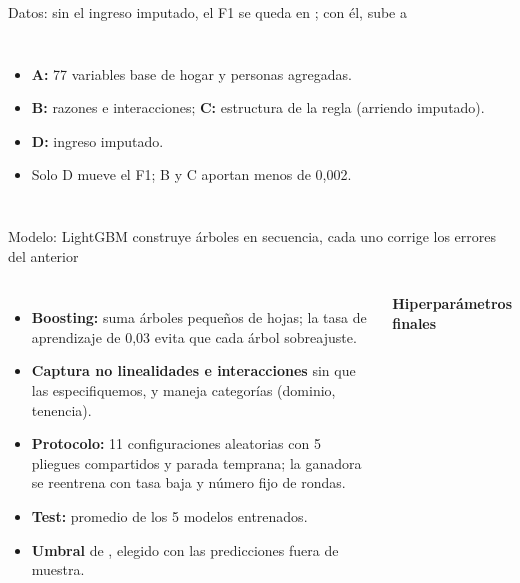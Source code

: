 \begin{frame}{Datos: sin el ingreso imputado, el F1 se queda en \nFoneA{}; con él, sube a \nFoneAD{}}
  \begin{columns}[T]
    \small
    \begin{itemize}\setlength{\itemsep}{3pt}
      \item \textbf{A:} 77 variables base de hogar y personas agregadas.
      \item \textbf{B:} razones e interacciones; \textbf{C:} estructura de la regla (arriendo imputado).
      \item \textbf{D:} ingreso imputado.
      \item Solo D mueve el F1; B y C aportan menos de 0,002.
    \end{itemize}
  \end{columns}
\end{frame}

\begin{frame}{Modelo: LightGBM construye árboles en secuencia, cada uno corrige los errores del anterior}
  \begin{columns}[T]
    \small
    \begin{itemize}\setlength{\itemsep}{3pt}
      \item \textbf{Boosting:} suma \nRondasLGBM{} árboles pequeños de \nHojasLGBM{} hojas; la tasa de aprendizaje de 0,03 evita que cada árbol sobreajuste.
      \item \textbf{Captura no linealidades e interacciones} sin que las especifiquemos, y maneja categorías (dominio, tenencia).
      \item \textbf{Protocolo:} 11 configuraciones aleatorias con 5 pliegues compartidos y parada temprana; la ganadora se reentrena con tasa baja y número fijo de rondas.
      \item \textbf{Test:} promedio de los 5 modelos entrenados.
      \item \textbf{Umbral} de \nThrLGBM{}, elegido con las predicciones fuera de muestra.
    \end{itemize}
    \centering\small\textbf{Hiperparámetros finales}\\[1mm]
    \footnotesize
    
  \end{columns}
\end{frame}

